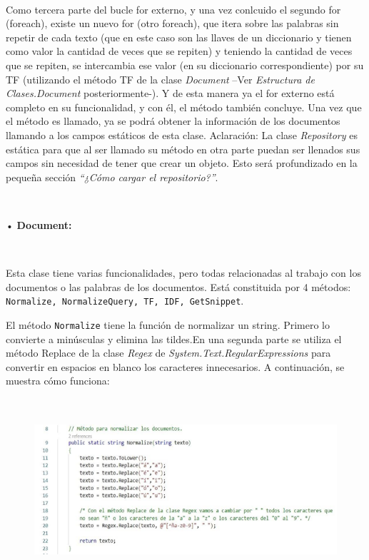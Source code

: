 \documentclass{article}
\begin{document}
\


Como tercera parte del bucle for externo, y una vez conlcuido el segundo for (foreach), existe
un nuevo for (otro foreach), que itera sobre las palabras sin repetir de cada texto (que en este
caso son las llaves de un diccionario y tienen como valor la cantidad de veces que se repiten)
y teniendo la cantidad de veces que se repiten, se intercambia ese valor (en su diccionario
correspondiente) por su TF (utilizando el método TF de la clase {\textit{Document}} –Ver
{\textit{Estructura de Clases.Document}} posteriormente-). Y de esta manera ya el for externo está completo en su
funcionalidad, y con él, el método también concluye. Una vez que el método es llamado, ya se
podrá obtener la información de los documentos llamando a los campos estáticos de esta clase.
Aclaración: La clase {\textit{Repository}} es estática para que al ser llamado su método en otra parte
puedan ser llenados sus campos sin necesidad de tener que crear un objeto. Esto será
profundizado en la pequeña sección {\textit{“¿Cómo cargar el repositorio?”}}.


\


• \textbf{Document:}


\


Esta clase tiene varias funcionalidades, pero todas relacionadas al trabajo con los documentos
o las palabras de los documentos. Está constituida por 4 métodos: {\texttt{Normalize, NormalizeQuery,
TF, IDF, GetSnippet}}.

El método {\texttt{Normalize}} tiene la función de normalizar un string. Primero lo convierte a minúsculas
y elimina las tildes.En una segunda parte se utiliza el método Replace de la clase {\textit{Regex}} de
{\textit{System.Text.RegularExpressions}} para convertir en espacios en blanco los caracteres
innecesarios. A continuación, se muestra cómo funciona:


\


\begin{figure}[h]
	\begin{center}
		\includegraphics[width = 12cm, height = 5cm]{img3.png}
	\end{center}
\end{figure}
\end{document}
